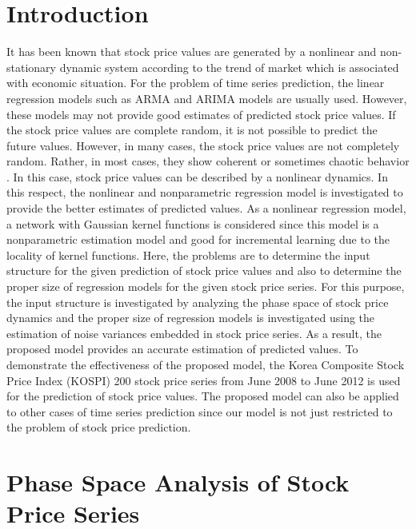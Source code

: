 \documentclass[runningheads,a4paper]{llncs}
\begin{document}
\section{Introduction}
It has been known that stock price values are generated by a nonlinear and non-stationary dynamic system according to
the trend of market which is associated with economic situation. For the problem of time series prediction,
the linear regression models such as ARMA and ARIMA models are usually used. However, these models
may not provide good estimates of predicted stock price values. If the stock price values are complete random, it is not possible to
predict the future values. However, in many cases, the stock price values are not completely random. Rather, in most cases,
they show coherent or sometimes chaotic behavior \cite{peter}.
In this case, stock price values can be described by a nonlinear dynamics. In this respect,
the nonlinear and nonparametric regression model is investigated to provide the better estimates of predicted values.
As a nonlinear regression model, a network with Gaussian kernel functions is considered since this model is
a nonparametric estimation model and
good for incremental learning due to the locality of kernel functions. Here, the problems are to determine the input structure
for the given prediction of stock price values and also to determine the proper size of regression models for the given stock price series.
For this purpose, the input structure is investigated by analyzing the phase space of stock price dynamics and
the proper size of regression models is investigated using the estimation of noise variances embedded in stock price series.
As a result, the proposed model provides an accurate estimation of predicted values. To demonstrate the effectiveness of
the proposed model, the Korea Composite Stock Price Index (KOSPI) 200 stock price series from June 2008 to June 2012 is used
for the prediction of stock price values. The proposed model can also be applied to other cases of time series prediction since  our model
is not just restricted to the problem of stock price prediction.

\section{Phase Space Analysis of Stock Price Series}
\end{document}
